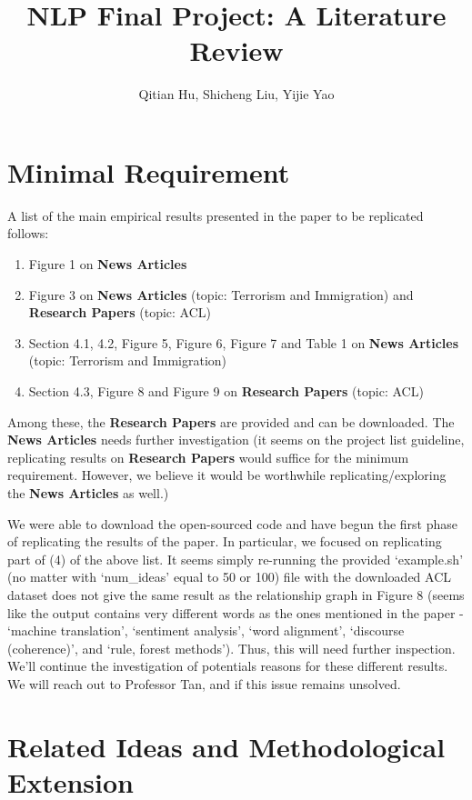 \documentclass{article}
\title{NLP Final Project: A Literature Review}
\author{Qitian Hu, Shicheng Liu, Yijie Yao}
\begin{document}
\maketitle 

\section{Minimal Requirement}

A list of the main empirical results presented in the paper to be replicated
\cite{original} follows:

\begin{enumerate}
  \item Figure 1 on \textbf{News Articles}
  \item Figure 3 on \textbf{News Articles} (topic: Terrorism and Immigration)
   and \textbf{Research Papers} (topic: ACL)
  \item Section 4.1, 4.2, Figure 5, Figure 6, Figure 7 and Table 1 on 
  \textbf{News Articles} (topic: Terrorism and Immigration)
  \item Section 4.3, Figure 8 and Figure 9 on \textbf{Research Papers} 
  (topic: ACL)
\end{enumerate}

Among these, the \textbf{Research Papers} are provided and can be downloaded. 
The \textbf{News Articles} needs further investigation (it seems on the 
project list guideline, replicating results on \textbf{Research Papers}
would suffice for the minimum requirement. However, we believe it would be
worthwhile replicating/exploring the \textbf{News Articles} as well.)

We were able to download the open-sourced code and have begun the first phase of replicating
the results of the paper. In particular, we focused on replicating part of (4)
of the above list. It seems simply re-running the provided `example.sh'
(no matter with `num\_ideas' equal to 50 or 100)
file with the downloaded ACL dataset does not give the same result as the
relationship graph in Figure 8 (seems like the output contains very different
words as the ones mentioned in the paper - `machine translation', 
`sentiment analysis', `word alignment', `discourse (coherence)', and 
`rule, forest methods'). Thus, this will need further inspection. We'll continue
the investigation of potentials reasons for these different results. We will reach out to Professor Tan, and if this issue remains unsolved.

\section{Related Ideas and Methodological Extension}
\end{document}
